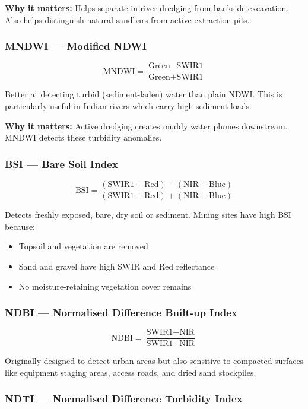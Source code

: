 \documentclass[12pt, a4paper]{article}
\begin{document}
\textbf{Why it matters:} Helps separate in-river dredging from
bankside excavation. Also helps distinguish natural sandbars from
active extraction pits.

\subsubsection{MNDWI --- Modified NDWI}

\[
  \text{MNDWI} = \frac{\text{Green} - \text{SWIR1}}{\text{Green} + \text{SWIR1}}
\]

Better at detecting turbid (sediment-laden) water than plain NDWI.
This is particularly useful in Indian rivers which carry high
sediment loads.

\textbf{Why it matters:} Active dredging creates muddy water plumes
downstream. MNDWI detects these turbidity anomalies.

\subsubsection{BSI --- Bare Soil Index}

\[
  \text{BSI} = \frac{(\text{SWIR1} + \text{Red}) - (\text{NIR} + \text{Blue})}
                     {(\text{SWIR1} + \text{Red}) + (\text{NIR} + \text{Blue})}
\]

Detects freshly exposed, bare, dry soil or sediment. Mining sites have
high BSI because:
\begin{itemize}[noitemsep]
  \item Topsoil and vegetation are removed
  \item Sand and gravel have high SWIR and Red reflectance
  \item No moisture-retaining vegetation cover remains
\end{itemize}

\subsubsection{NDBI --- Normalised Difference Built-up Index}

\[
  \text{NDBI} = \frac{\text{SWIR1} - \text{NIR}}{\text{SWIR1} + \text{NIR}}
\]

Originally designed to detect urban areas but also sensitive to
compacted surfaces like equipment staging areas, access roads, and
dried sand stockpiles.

\subsubsection{NDTI --- Normalised Difference Turbidity Index}
\end{document}
